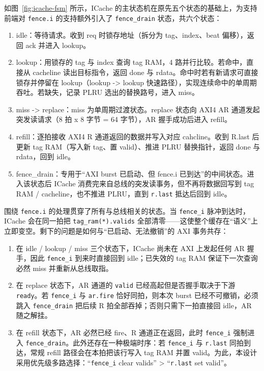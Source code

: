 如图~\ref{fig:icache-fsm} 所示，ICache 的主状态机在原先五个状态的基础上，为支持前端对 \lstinline|fence.i| 的支持额外引入了 \lstinline|fence_drain| 状态，共六个状态：

\begin{enumerate}
  \item idle：等待请求。收到 req 时锁存地址（拆分为 tag、index、beat 偏移），返回 ack 并进入 lookup。
  \item lookup：用锁存的 tag 与 index 查询 tag RAM，4 路并行比较。若命中，直接从 cacheline 读出目标指令，返回 done 与 rdata。命中时若有新请求可直接锁存并停留在 lookup（lookup -> lookup 快速路径），实现连续命中的单周期吞吐。若缺失，记录 PLRU 选出的替换路号，进入 miss。
  \item miss -> replace：miss 为单周期过渡状态。replace 状态向 AXI4 AR 通道发起突发读请求（8 拍 x 8 字节 = 64 字节），AR 握手成功后进入 refill。
  \item refill：逐拍接收 AXI4 R 通道返回的数据并写入对应 cahcline。收到 R.last 后更新 tag RAM（写入新 tag、置 valid）、推进 PLRU 替换指针，返回 done 与 rdata，回到 idle。
  \item fence\_drain：专用于“AXI burst 已启动、但 fence.i 已到达”的中间状态。进入该状态后 ICache 消费完来自总线的突发读事务，但不再将数据回写到 tag RAM / cacheline，也不推进 PLRU，直到 \lstinline|r.last| 抵达后回到 idle。
\end{enumerate}

围绕 \lstinline|fence.i| 的处理贯穿了所有与总线相关的状态。当 \lstinline|fence_i| 脉冲到达时，ICache 会在同一拍把 \lstinline|tag_ram(*).valids| 全部清零——这使整个缓存在“语义”上立即变空。剩下的问题是如何与“已启动、无法撤销”的 AXI 事务共存：

\begin{enumerate}
  \item 在 idle / lookup / miss 三个状态下，ICache 尚未在 AXI 上发起任何 AR 握手，因此 \lstinline|fence_i| 到来时直接回到 idle；已失效的 tag RAM 保证下一次查询必然 miss 并重新从总线取指。
  \item 在 replace 状态下，AR 通道的 \lstinline|valid| 已经高起但是否握手取决于下游 \lstinline|ready|。若 \lstinline|fence_i| 与 \lstinline|ar.fire| 恰好同拍，则本次 burst 已经不可撤销，必须跳入 \lstinline|fence_drain| 把后续 R 拍全部吞掉；否则只需下一拍直接回 idle，AR 随之解挂。
  \item 在 refill 状态下，AR 必然已经 fire、R 通道正在返回，此时 \lstinline|fence_i| 强制进入 \lstinline|fence_drain|。此外还存在一种极端时序：若 \lstinline|fence_i| 与 \lstinline|r.last| 同拍到达，常规 refill 路径会在本拍把该行写入 tag RAM 并置 valid。为此，本设计采用优先级多路选择：“\lstinline|fence_i| clear valids” > “\lstinline|r.last| set valid”。
\end{enumerate}

